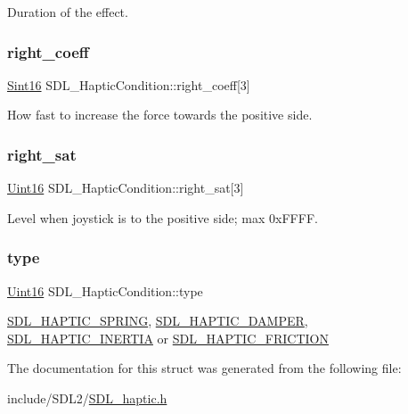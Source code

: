 Duration of the effect. \mbox{\label{struct_s_d_l___haptic_condition_a3de7f164ef88841255535387d0f100b6}} 
\subsubsection{\texorpdfstring{right\+\_\+coeff}{right\_coeff}}
{\footnotesize\ttfamily \hyperlink{_s_d_l__stdinc_8h_a9d0257032c0e146ab6121bf0122712f5}{Sint16} S\+D\+L\+\_\+\+Haptic\+Condition\+::right\+\_\+coeff\mbox{[}3\mbox{]}}

How fast to increase the force towards the positive side. \mbox{\label{struct_s_d_l___haptic_condition_a90427a1e0d464b4b53abc1d419c97b2e}} 
\subsubsection{\texorpdfstring{right\+\_\+sat}{right\_sat}}
{\footnotesize\ttfamily \hyperlink{_s_d_l__stdinc_8h_a31fcc0a076c9068668173ee26d33e42b}{Uint16} S\+D\+L\+\_\+\+Haptic\+Condition\+::right\+\_\+sat\mbox{[}3\mbox{]}}

Level when joystick is to the positive side; max 0x\+F\+F\+FF. \mbox{\label{struct_s_d_l___haptic_condition_a7be55a9a86c05dd1a54a3006781cfa6f}} 
\subsubsection{\texorpdfstring{type}{type}}
{\footnotesize\ttfamily \hyperlink{_s_d_l__stdinc_8h_a31fcc0a076c9068668173ee26d33e42b}{Uint16} S\+D\+L\+\_\+\+Haptic\+Condition\+::type}

\hyperlink{_s_d_l__haptic_8h_a3b52d4700380085e2b5d87bb20320fb1}{S\+D\+L\+\_\+\+H\+A\+P\+T\+I\+C\+\_\+\+S\+P\+R\+I\+NG}, \hyperlink{_s_d_l__haptic_8h_a69522f261973e3ea4273486141320a87}{S\+D\+L\+\_\+\+H\+A\+P\+T\+I\+C\+\_\+\+D\+A\+M\+P\+ER}, \hyperlink{_s_d_l__haptic_8h_a14b807471589120395aec28293cf6642}{S\+D\+L\+\_\+\+H\+A\+P\+T\+I\+C\+\_\+\+I\+N\+E\+R\+T\+IA} or \hyperlink{_s_d_l__haptic_8h_a98a5011311168d63921aaac21403a4d8}{S\+D\+L\+\_\+\+H\+A\+P\+T\+I\+C\+\_\+\+F\+R\+I\+C\+T\+I\+ON} 

The documentation for this struct was generated from the following file\+:\begin{DoxyCompactItemize}
\item 
include/\+S\+D\+L2/\hyperlink{_s_d_l__haptic_8h}{S\+D\+L\+\_\+haptic.\+h}\end{DoxyCompactItemize}
